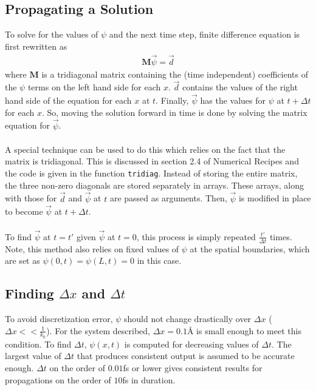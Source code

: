 \documentclass[12pt]{article}
\newcommand{\dx}{\Delta x}
\newcommand{\dt}{\Delta t}
\begin{document}
\subsection{Propagating a Solution}
To solve for the values of $\psi$ and the next time step, finite difference equation is first rewritten as
\begin{align*}
\mathbf{M}\vec{\psi} = \vec{d}
\end{align*}
where $\mathbf{M}$ is a tridiagonal matrix containing the (time independent) coefficients of the $\psi$ terms on the left hand side for each $x$. $\vec{d}$ contains the values of the right hand side of the equation for each $x$ at $t$. Finally, $\vec{\psi}$ has the values for $\psi$ at $t + \dt$ for each $x$. So, moving the solution forward in time is done by solving the matrix equation for $\vec{\psi}$. \\ \\
A special technique can be used to do this which relies on the fact that the matrix is tridiagonal. This is discussed in section 2.4 of Numerical Recipes \cite{numericalrecipes} and the code is given in the function \texttt{tridiag}. Instead of storing the entire matrix, the three non-zero diagonals are stored separately in arrays. These arrays, along with those for $\vec{d}$ and $\vec{\psi}$ at $t$ are passed as arguments. Then, $\vec{\psi}$ is modified in place to become $\vec{\psi}$ at $t + \dt$.\\ \\
To find $\vec{\psi}$ at $t = t'$ given $\vec{\psi}$ at $t = 0$, this process is simply repeated $\frac{t'}{\dt}$ times. Note, this method also relies on fixed values of $\psi$ at the spatial boundaries, which are set as $\psi(0, t) = \psi(L, t) = 0$ in this case.
\subsection{Finding $\dx$ and $\dt$}
To avoid discretization error, $\psi$ should not change drastically over $\dx$ ($\dx << \frac{1}{k_0}$). For the system described, $\dx = 0.1\text{\AA}$ is small enough to meet this condition. To find $\dt$, $\psi(x, t)$ is computed for decreasing values of $\dt$. The largest value of $\dt$ that produces consistent output is assumed to be accurate enough. $\dt$ on the order of $0.01$fs or lower gives consistent results for propagations on the order of $10$fs in duration.
\end{document}
